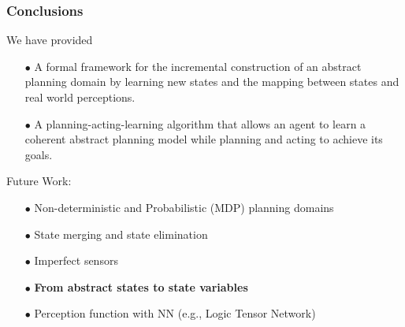 \documentclass{beamer}
\begin{document}
\begin{frame}
\frametitle{Conclusions}

We have provided
\begin{itemize}
\item[$\bullet$]
A formal framework for the incremental 
construction of an abstract planning domain by learning new states
and the mapping between states and real world perceptions.
\item[$\bullet$]
A planning-acting-learning algorithm that allows an agent to learn
a coherent abstract planning model while planning and acting to achieve its
goals.
\end{itemize}

\pause
{\color {red}
Future Work:}
\begin{itemize}
\item[$\bullet$]
{\color {red}
Non-deterministic and Probabilistic (MDP) planning domains}
\item[$\bullet$]
{\color {red}
State merging and state elimination}
\item[$\bullet$] 
{\color {red} Imperfect sensors}
\item[$\bullet$] 
{\bf
{\color {red} From abstract states to state variables}}
\item[$\bullet$] 
{\color {red} Perception function with NN (e.g., Logic Tensor Network)}
\end{itemize}

\end{frame}
\end{document}
